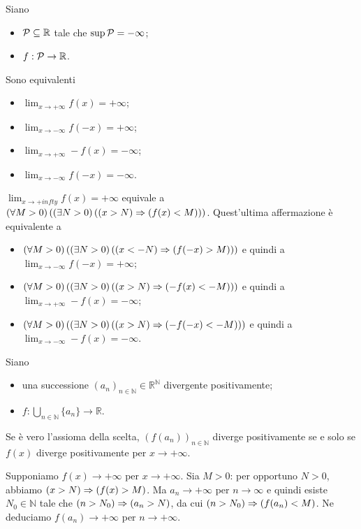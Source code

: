\begin{Theorem}
	Siano
	\begin{itemize}
		\item $\mathcal{P} \subseteq \mathbb{R}$ tale che $\sup{\mathcal{P}} = - \infty$;
		\item $f: \mathcal{P} \rightarrow \mathbb{R}$.
	\end{itemize}
	Sono equivalenti
	\begin{itemize}
		\item $\lim_{x \rightarrow +\infty} f(x) = +\infty$;
		\item $\lim_{x \rightarrow -\infty} f(-x) = +\infty$;
		\item $\lim_{x \rightarrow +\infty} -f(x) = -\infty$;
		\item $\lim_{x \rightarrow -\infty} f(-x) = -\infty$.
	\end{itemize}
\end{Theorem}
\Proof $\lim_{x \rightarrow +infty} f(x) = +\infty$ equivale a $\left ( \forall M > 0 \right ) \left ( \left ( \exists N > 0 \right ) \left ( \left ( x > N \right ) \Rightarrow \left ( f(x) < M \right ) \right ) \right )$. Quest'ultima affermazione \`e equivalente a
\begin{itemize}
	\item $\left ( \forall M > 0 \right ) \left ( \left ( \exists N > 0 \right ) \left ( \left ( x < - N \right ) \Rightarrow \left ( f(-x) > M \right ) \right ) \right )$ e quindi a $\lim_{x \rightarrow -\infty} f(-x) = +\infty$;
	\item $\left ( \forall M > 0 \right ) \left ( \left ( \exists N > 0 \right ) \left ( \left ( x > N \right ) \Rightarrow \left ( - f(x) < - M \right ) \right ) \right )$ e quindi a $\lim_{x \rightarrow +\infty} - f(x) = -\infty$;
	\item $\left ( \forall M > 0 \right ) \left ( \left ( \exists N > 0 \right ) \left ( \left ( x > N \right ) \Rightarrow \left ( - f(-x) < - M \right ) \right ) \right )$ e quindi a $\lim_{x \rightarrow -\infty} - f(x) = -\infty$. \EndProof
\end{itemize}
\begin{Theorem}
	Siano
	\begin{itemize}
		\item una successione $(a_n)_{n \in \mathbb{N}} \in \mathbb{R}^\mathbb{N}$ divergente positivamente;
		\item $f: \bigcup_{n \in \mathbb{N}} \lbrace a_n \rbrace \rightarrow \mathbb{R}$.
	\end{itemize}
	Se \`e vero l'assioma della scelta, $(f(a_n))_{n \in \mathbb{N}}$ diverge positivamente se e solo se $f(x)$ diverge positivamente per $x \rightarrow +\infty$.
\end{Theorem}
\Proof Supponiamo $f(x) \rightarrow +\infty$ per $x \rightarrow +\infty$. Sia $M > 0$: per opportuno $N > 0$, abbiamo $\left ( x > N \right ) \Rightarrow \left ( f(x) > M \right )$. Ma $a_n \rightarrow +\infty$ per $n \rightarrow \infty$ e quindi esiste $N_0 \in \mathbb{N}$ tale che $\left ( n > N_0 \right ) \Rightarrow \left ( a_n > N \right )$, da cui $\left ( n > N_0 \right ) \Rightarrow \left ( f(a_n) < M \right )$. Ne deduciamo $f(a_n) \rightarrow +\infty$ per $n \rightarrow +\infty$.

